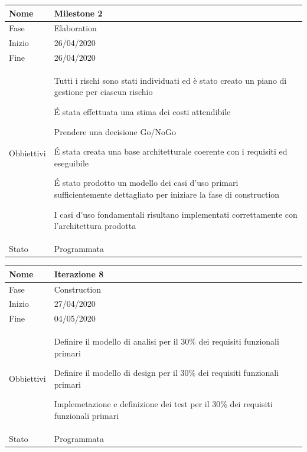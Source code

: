 \begin{center}
\begin{tabular}{ |p{2cm}|p{10cm}|  }
\hline
Nome & Milestone 2\\\hline
Fase & Elaboration \\\hline
Inizio & 26/04/2020 \\\hline
Fine &  26/04/2020 \\\hline
Obbiettivi & 
	\begin{compactitem}
		\item Tutti i rischi sono stati individuati ed è stato creato un piano di gestione per ciascun rischio
		\item \'E stata effettuata una stima dei costi attendibile
		\item Prendere una decisione Go/NoGo
		\item \'E stata creata una base architetturale coerente con i requisiti ed eseguibile
		\item \'E stato prodotto un modello dei casi d'uso primari sufficientemente dettagliato per iniziare la fase di construction
		\item I casi d'uso fondamentali risultano implementati correttamente con l'architettura prodotta
	\end{compactitem}\\\hline
Stato &  Programmata \\\hline
\end{tabular}
\label{table:milestone2}\newline

\begin{tabular}{ |p{2cm}|p{10cm}|  }
\hline
Nome & Iterazione 8 \\\hline
Fase & Construction \\\hline
Inizio & 27/04/2020 \\\hline
Fine &  04/05/2020  \\\hline
Obbiettivi & 
	\begin{compactitem}

		\item Definire il modello di analisi per il 30\% dei requisiti funzionali primari
		\item Definire il modello di design per il 30\% dei requisiti funzionali primari
		\item Implemetazione e definizione dei test per il 30\% dei requisiti funzionali primari
	\end{compactitem}\\\hline
Stato &  Programmata \\\hline
\end{tabular}
\label{table:8}\newline


\end{center}
